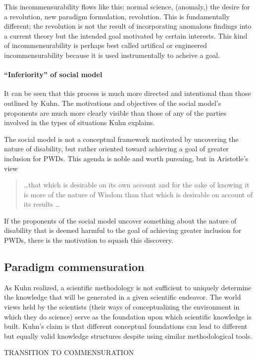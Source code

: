 \documentclass[a4paper]{article}
\begin{document}
This incommensurability flows like this: normal science, (anomaly,) the desire
for a revolution, new paradigm formulation, revolution. This is fundamentally
different; the revolution is not the result of incorporating anomalous
findings into a current theory but the intended goal motivated by certain
interests. This kind of incommensurability is perhaps best called artifical or
engineered incommensurability because it is used instrumentally to acheive a
goal.

\paragraph{``Inferiority'' of social model}
It can be seen that this process is much more directed and intentional than
those outlined by Kuhn. The motivations and objectives of the social model's
proponents are much more clearly visible than those of any of the parties
involved in the types of situations Kuhn explains.

The social model is not a conceptual framework motivated by uncovering the
nature of disability, but rather oriented toward achieving a goal of greater
inclusion for PWDs. This agenda is noble and worth pursuing, but in
Aristotle's view
%
\begin{quote}
    \ldots that which is desirable on its own account and for the sake of
    knowing it is more of the nature of Wisdom than that which is desirable on
    account of its results \ldots
\end{quote}
%
If the proponents of the social model uncover something about the nature of
disability that is deemed harmful to the goal of achieving greater
inclusion for PWDs, there is the motivation to squash this discovery.

\subsection{Paradigm commensuration}

As Kuhn realized, a scientific methodology is not sufficient to uniquely
determine the knowledge that will be generated in a given scientific endeavor.
The world views held by the scientists (their ways of conceptualizing the
environment in which they do science) serve as the foundation upon which
scientific knowledge is built. Kuhn's claim is that different conceptual
foundations can lead to different but equally valid knowledge structures
despite using similar methodological tools.

TRANSITION TO COMMENSURATION
\end{document}
